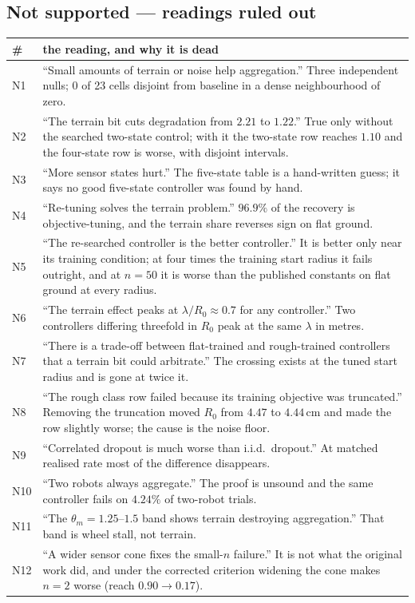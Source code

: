 \documentclass[11pt,a4paper]{article}
\begin{document}
\subsection*{Not supported --- readings ruled out}

\begin{longtable}{p{}p{}}
\toprule
\# & the reading, and why it is dead \\
\midrule
\endhead
N1 & ``Small amounts of terrain or noise help aggregation.'' Three independent nulls; 0 of 23 cells disjoint from baseline in a dense neighbourhood of zero. \\
N2 & ``The terrain bit cuts degradation from $2.21$ to $1.22$.'' True only without the searched two-state control; with it the two-state row reaches $1.10$ and the four-state row is worse, with disjoint intervals. \\
N3 & ``More sensor states hurt.'' The five-state table is a hand-written guess; it says no good five-state controller was found by hand. \\
N4 & ``Re-tuning solves the terrain problem.'' $96.9\%$ of the recovery is objective-tuning, and the terrain share reverses sign on flat ground. \\
N5 & ``The re-searched controller is the better controller.'' It is better only near its training condition; at four times the training start radius it fails outright, and at $n = 50$ it is worse than the published constants on flat ground at every radius. \\
N6 & ``The terrain effect peaks at $\lambda/R_0 \approx 0.7$ for any controller.'' Two controllers differing threefold in $R_0$ peak at the same $\lambda$ in metres. \\
N7 & ``There is a trade-off between flat-trained and rough-trained controllers that a terrain bit could arbitrate.'' The crossing exists at the tuned start radius and is gone at twice it. \\
N8 & ``The rough class row failed because its training objective was truncated.'' Removing the truncation moved $R_0$ from $4.47$ to $4.44$\,cm and made the row slightly worse; the cause is the noise floor. \\
N9 & ``Correlated dropout is much worse than i.i.d.\ dropout.'' At matched realised rate most of the difference disappears. \\
N10 & ``Two robots always aggregate.'' The proof is unsound and the same controller fails on $4.24\%$ of two-robot trials. \\
N11 & ``The $\theta_m = 1.25$--$1.5$ band shows terrain destroying aggregation.'' That band is wheel stall, not terrain. \\
N12 & ``A wider sensor cone fixes the small-$n$ failure.'' It is not what the original work did, and under the corrected criterion widening the cone makes $n = 2$ worse (reach $0.90 \to 0.17$). \\
\bottomrule
\end{longtable}
\end{document}
